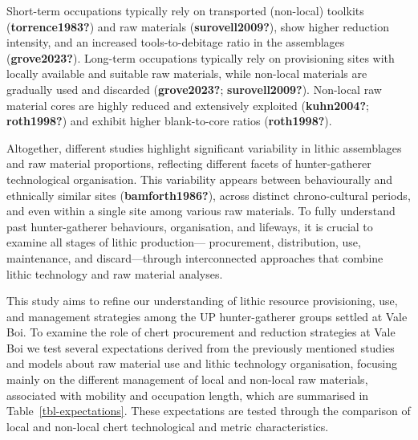 \documentclass[
  a4paper,
  DIV=11,
  numbers=noendperiod]{scrreprt}
\begin{document}
Short-term occupations typically rely on transported (non-local)
toolkits (\textbf{torrence1983?}) and raw materials
(\textbf{surovell2009?}), show higher reduction intensity, and an
increased tools-to-debitage ratio in the assemblages
(\textbf{grove2023?}). Long-term occupations typically rely on
provisioning sites with locally available and suitable raw materials,
while non-local materials are gradually used and discarded
(\textbf{grove2023?}; \textbf{surovell2009?}). Non-local raw material
cores are highly reduced and extensively exploited (\textbf{kuhn2004?};
\textbf{roth1998?}) and exhibit higher blank-to-core ratios
(\textbf{roth1998?}).

Altogether, different studies highlight significant variability in
lithic assemblages and raw material proportions, reflecting different
facets of hunter-gatherer technological organisation. This variability
appears between behaviourally and ethnically similar sites
(\textbf{bamforth1986?}), across distinct chrono-cultural periods, and
even within a single site among various raw materials. To fully
understand past hunter-gatherer behaviours, organisation, and lifeways,
it is crucial to examine all stages of lithic production--- procurement,
distribution, use, maintenance, and discard---through interconnected
approaches that combine lithic technology and raw material analyses.

This study aims to refine our understanding of lithic resource
provisioning, use, and management strategies among the UP
hunter-gatherer groups settled at Vale Boi. To examine the role of chert
procurement and reduction strategies at Vale Boi we test several
expectations derived from the previously mentioned studies and models
about raw material use and lithic technology organisation, focusing
mainly on the different management of local and non-local raw materials,
associated with mobility and occupation length, which are summarised in
Table~\ref{tbl-expectations}. These expectations are tested through the
comparison of local and non-local chert technological and metric
characteristics.
\end{document}
